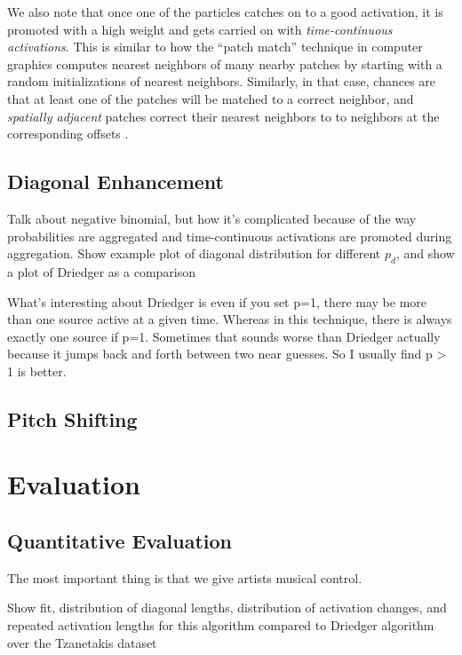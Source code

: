 \documentclass{article}
\begin{document}
We also note that once one of the particles catches on to a good activation, it is promoted with a high weight and gets carried on with {\em time-continuous activations}.  This is similar to how the ``patch match'' technique in computer graphics \cite{Barnes:2009:PAR, Barnes:2010:TGP} computes nearest neighbors of many nearby patches by starting with a random initializations of nearest neighbors.  Similarly, in that case, chances are that at least one of the patches will be matched to a correct neighbor, and {\em spatially adjacent} patches correct their nearest neighbors to to neighbors at the corresponding offsets \cite{Barnes:2009:PAR}.

\subsection{Diagonal Enhancement}

Talk about negative binomial, but how it's complicated because of the way probabilities are aggregated and time-continuous activations are promoted during aggregation.  Show example plot of diagonal distribution for different $p_d$, and show a plot of Driedger as a comparison

What's interesting about Driedger is even if you set p=1, there may be more than one source active at a given time.  Whereas in this technique, there is always exactly one source if p=1.  Sometimes that sounds worse than Driedger actually because it jumps back and forth between two near guesses.  So I usually find p > 1 is better.

\subsection{Pitch Shifting}



\section{Evaluation}

\subsection{Quantitative Evaluation}
\label{sec:quantitativeevaluation}
The most important thing is that we give artists musical control.

Show fit, distribution of diagonal lengths, distribution of activation changes, and repeated activation lengths for this algorithm compared to Driedger algorithm over the Tzanetakis dataset
\end{document}

